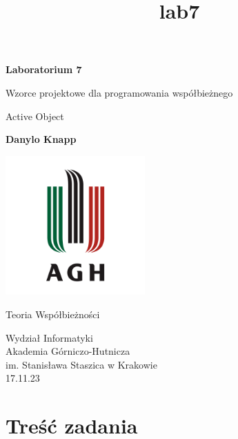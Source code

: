 \documentclass[11pt]{article}
\title{lab7}
\begin{document}
    
    \begin{titlepage}
        \begin{center}
            \vspace*{1cm}
    
            \textbf{Laboratorium 7}
    
            \vspace{0.5cm}
            Wzorce projektowe dla programowania współbieżnego

            \vspace{0.1cm}
            Active Object
                
            \vspace{1.5cm}
    
            \textbf{Danylo Knapp}

            \vfill

            \includegraphics[width=0.4\textwidth]{../report-templates/agh-logo.png}
    
            \vfill
                
            Teoria Współbieżności
                
            \vspace{0.8cm}

            Wydział Informatyki\\
            Akademia Górniczo-Hutnicza\\
            im. Stanisława Staszica w Krakowie\\
            17.11.23
                
        \end{center}
    \end{titlepage}
    
    

    
    \hypertarget{treux15bux107-zadania}{%
\section{Treść zadania}\label{treux15bux107-zadania}}
\end{document}
